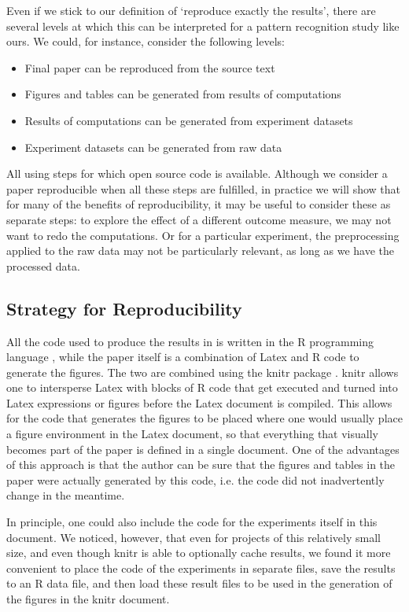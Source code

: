 \documentclass[twoside]{memoir}\usepackage[]{graphicx}\usepackage{xcolor}
\renewcommand{\cite}{\citep}
\begin{document}
Even if we stick to our definition of `reproduce exactly the results', there are several levels at which this can be interpreted for a pattern recognition study like ours. We could, for instance, consider the following levels:
\begin{itemize}
\item Final paper can be reproduced from the source text
\item Figures and tables can be generated from results of computations
\item Results of computations can be generated from experiment datasets
\item Experiment datasets can be generated from raw data 
\end{itemize}
All using steps for which open source code is available. Although we consider a paper reproducible when all these steps are fulfilled, in practice we will show that for many of the benefits of reproducibility, it may be useful to consider these as separate steps: to explore the effect of a different outcome measure, we may not want to redo the computations. Or for a particular experiment, the preprocessing applied to the raw data may not be particularly relevant, as long as we have the processed data.

\subsection{Strategy for Reproducibility}
All the code used to produce the results in \citep{Krijthe2016a} is written in the R programming language \citep{RCoreTeam2016}, while the paper itself is a combination of Latex and R code to generate the figures. The two are combined using the knitr package \cite{Xie2014}. knitr allows one to intersperse Latex with blocks of R code that get executed and turned into Latex expressions or figures before the Latex document is compiled. This allows for the code that generates the figures to be placed where one would usually place a figure environment in the Latex document, so that everything that visually becomes part of the paper is defined in a single document. One of the advantages of this approach is that the author can be sure that the figures and tables in the paper were actually generated by this code, i.e. the code did not inadvertently change in the meantime.

In principle, one could also include the code for the experiments itself in this document. We noticed, however, that even for projects of this relatively small size, and even though knitr is able to optionally cache results, we found it more convenient to place the code of the experiments in separate files, save the results to an R data file, and then load these result files to be used in the generation of the figures in the knitr document.
\end{document}

